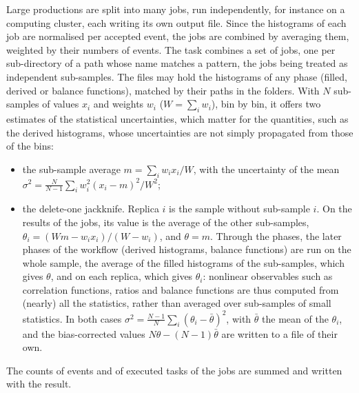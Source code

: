 Large productions are split into many jobs, run independently, for instance on a computing cluster, each writing its
own output file. Since the histograms of each job are normalised per accepted event, the jobs are combined by averaging
them, weighted by their numbers of events. The task  combines a set of jobs, one per
sub-directory of a path whose name matches a pattern, the jobs being treated as independent sub-samples. The files may
hold the histograms of any phase (filled, derived or balance functions), matched by their paths in the folders. With
$N$ sub-samples of values $x_i$ and weights $w_i$ ($W=\sum_i w_i$), bin by bin, it offers two estimates of the
statistical uncertainties, which matter for the quantities, such as the derived histograms, whose uncertainties are not
simply propagated from those of the bins:
\begin{itemize}
\item the sub-sample average $m=\sum_i w_i x_i/W$, with the uncertainty of the mean
  $\sigma^2 = \frac{N}{N-1}\sum_i w_i^2 (x_i-m)^2/W^2$;
\item the delete-one jackknife. Replica $i$ is the sample without sub-sample $i$. On the results of the jobs, its value
  is the average of the other sub-samples, $\theta_i=(Wm-w_ix_i)/(W-w_i)$, and $\theta=m$. Through the phases, the
  later phases of the workflow (derived histograms, balance functions) are run on the whole sample, the average of the
  filled histograms of the sub-samples, which gives $\theta$, and on each replica, which gives $\theta_i$: nonlinear
  observables such as correlation functions, ratios and balance functions are thus computed from (nearly) all the
  statistics, rather than averaged over sub-samples of small statistics. In both cases
  $\sigma^2=\frac{N-1}{N}\sum_i(\theta_i-\bar\theta)^2$, with $\bar\theta$ the mean of the $\theta_i$, and the
  bias-corrected values $N\theta-(N-1)\bar\theta$ are written to a file of their own.
\end{itemize}
The counts of events and of executed tasks of the jobs are summed and written with the result.

